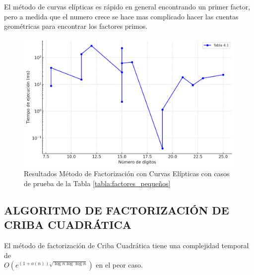     El método de curvas elípticas es rápido en general encontrando un primer factor, pero a medida que el numero crece se hace mas complicado hacer las cuentas geométricas para encontrar los factores primos.

    \begin{figure}[H]
        \centering
        \includegraphics[width=\linewidth]{images/res-curva-eliptica.png}
        \caption{Resultados Método de Factorización con Curvas Elípticas con casos de prueba de la Tabla \ref{tabla:factores_pequeños}}
    \end{figure}

    \subsection{ALGORITMO DE FACTORIZACIÓN DE CRIBA CUADRÁTICA}
    El método de factorización de Criba Cuadrática tiene una complejidad temporal de \\ $O(e^{(1+o(n))\sqrt{\log n \log \log n}})$ en el peor caso.

